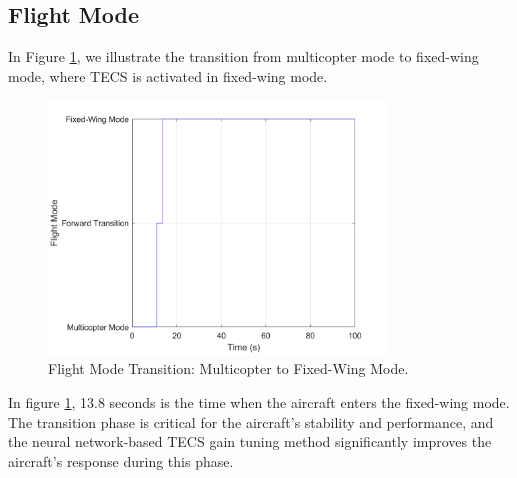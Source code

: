\documentclass[journal,article,submit,pdftex,moreauthors]{Definitions/mdpi}
\begin{document}
\subsection{Flight Mode}
In Figure \ref{fig:flight_state}, we illustrate the transition from multicopter mode to fixed-wing mode, where TECS is activated in fixed-wing mode.

\begin{figure}[H]
    \centering
    \includegraphics[width=0.8\textwidth]{flight_state_plot.png}
    \caption{Flight Mode Transition: Multicopter to Fixed-Wing Mode.}
    \label{fig:flight_state}
\end{figure}

In figure \ref{fig:flight_state}, 13.8 seconds is the time when the aircraft enters the fixed-wing mode. The transition phase is critical for the aircraft's stability and performance, and the neural network-based TECS gain tuning method significantly improves the aircraft's response during this phase.
\end{document}
